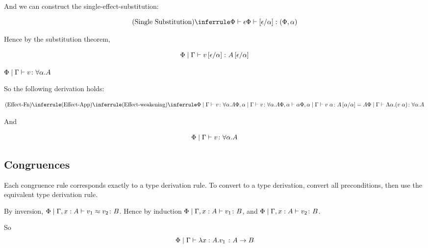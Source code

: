 {        And we can construct the single-effect-substitution:

        \begin{equation}
            \ntreeruleI{Single Substitution}{\wellformed{\P}{\e}}{\typerelation{\P}{\ssub{\a}{\e}}{(\P,\a)}}
        \end{equation}

        Hence by the substitution theorem,

        \begin{equation}
            \Phi\mid\Gamma \vdash v\left[\epsilon / \alpha\right] \colon A\left[\epsilon / \alpha\right]
        \end{equation}

    \bi $\Phi\mid\Gamma \vdash v \colon \forall \alpha. A$

    So the following derivation holds:

    \begin{equation}
        \ntreeruleI{Effect-Fn}{
            \ntreeruleII{Effect-App}{
                \ntreeruleI{Effect-weakening}{
                    \gpetyperelation{v}{\all{\a}{A}}
                }{
                    \etyperelation{\P,\a}{\G}{v}{\all{\a}{A}}
                }
            }{
                \wellformed{\P,\a}{\a}
            }{
                \etyperelation{\P,\a}{\G}{\eapp{v}{\a}}{A\ssub{\a}{\a}=A}
            }
        }{
            \gpetyperelation{\elam{\a}{(\eapp{v}{\a})}}{\all{\a}{A}}
        }
    \end{equation}

    And 

    \begin{equation}
        \Phi\mid\Gamma \vdash v \colon \forall \alpha. A
    \end{equation}

        \subsection{Congruences}
    Each congruence rule corresponds exactly to a type derivation rule. To convert to a type derivation, convert all preconditions, then use the equivalent type derivation rule.

        By inversion, $\Phi\mid\Gamma, x: A \vdash v_1 \approx v_2 \colon B$. Hence by induction $\Phi\mid\Gamma, x: A \vdash v_1 \colon B$, and $\Phi\mid\Gamma, x: A \vdash v_2 \colon B$.

        So 
        \begin{equation}
            \Phi\mid\Gamma \vdash \lambda x : A. v_1\; \colon A\rightarrow B
        \end{equation}

}
